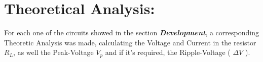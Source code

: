 \section{Theoretical Analysis:}

For each one of the circuits showed in the section {\bfseries\itshape Development}, a corresponding Theoretic Analysis was made, calculating the Voltage and Current in the resistor $R_{L}$, as well the Peak-Voltage $V_{p}$ and if it's required, the Ripple-Voltage ( $\Delta V$ ).
